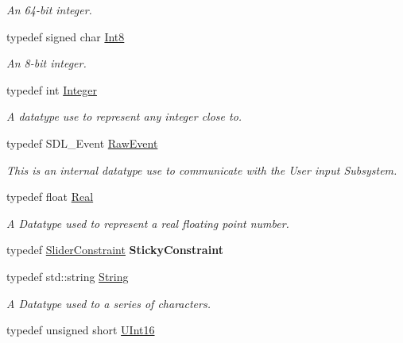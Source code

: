 \begin{DoxyCompactItemize}
\begin{DoxyCompactList}\small\item\em An 64-\/bit integer. \item\end{DoxyCompactList}\item 
typedef signed char \hyperlink{namespaceMezzanine_acbb048ee99aa07566d5a6eb33f5a2c2d}{Int8}
\begin{DoxyCompactList}\small\item\em An 8-\/bit integer. \item\end{DoxyCompactList}\item 
typedef int \hyperlink{namespaceMezzanine_ac3576e52af3c62d13dde94829e0c5465}{Integer}
\begin{DoxyCompactList}\small\item\em A datatype use to represent any integer close to. \item\end{DoxyCompactList}\item 
typedef SDL\_\-Event \hyperlink{namespaceMezzanine_ae8d4c0ab783af89a250b0225b75753e5}{RawEvent}
\begin{DoxyCompactList}\small\item\em This is an internal datatype use to communicate with the User input Subsystem. \item\end{DoxyCompactList}\item 
typedef float \hyperlink{namespaceMezzanine_a726731b1a7df72bf3583e4a97282c6f6}{Real}
\begin{DoxyCompactList}\small\item\em A Datatype used to represent a real floating point number. \item\end{DoxyCompactList}\item 
\hypertarget{namespaceMezzanine_a4a538e16995de98802eeb28ca209d721}{
typedef \hyperlink{classMezzanine_1_1SliderConstraint}{SliderConstraint} {\bfseries StickyConstraint}}
\label{namespaceMezzanine_a4a538e16995de98802eeb28ca209d721}

\item 
typedef std::string \hyperlink{namespaceMezzanine_acf9fcc130e6ebf08e3d8491aebcf1c86}{String}
\begin{DoxyCompactList}\small\item\em A Datatype used to a series of characters. \item\end{DoxyCompactList}\item 
\hypertarget{namespaceMezzanine_a1b6c09063432c7ddd87011c88306c767}{
typedef unsigned short \hyperlink{namespaceMezzanine_a1b6c09063432c7ddd87011c88306c767}{UInt16}}
\label{namespaceMezzanine_a1b6c09063432c7ddd87011c88306c767}


\end{DoxyCompactItemize}
